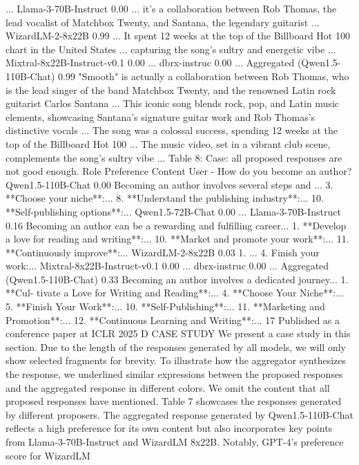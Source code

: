 ...
Llama-3-70B-Instruct
0.00
... it’s a collaboration between Rob Thomas, the lead vocalist of
Matchbox Twenty, and Santana, the legendary guitarist ...
WizardLM-2-8x22B
0.99
... It spent 12 weeks at the top of the Billboard Hot 100 chart in the
United States ... capturing the song’s sultry and energetic vibe ...
Mixtral-8x22B-Instruct-v0.1
0.00
...
dbrx-instruc
0.00
...
Aggregated
(Qwen1.5-110B-Chat)
0.99
"Smooth" is actually a collaboration between Rob Thomas, who is
the lead singer of the band Matchbox Twenty, and the renowned
Latin rock guitarist Carlos Santana ... This iconic song blends rock,
pop, and Latin music elements, showcasing Santana’s signature
guitar work and Rob Thomas’s distinctive vocals ... The song was a
colossal success, spending 12 weeks at the top of the Billboard Hot
100 ... The music video, set in a vibrant club scene, complements
the song’s sultry vibe ...
Table 8: Case: all proposed responses are not good enough.
Role
Preference
Content
User
-
How do you become an author?
Qwen1.5-110B-Chat
0.00
Becoming an author involves several steps and ... 3. **Choose
your niche**:... 8. **Understand the publishing industry**:... 10.
**Self-publishing options**:...
Qwen1.5-72B-Chat
0.00
...
Llama-3-70B-Instruct
0.16
Becoming an author can be a rewarding and fulfilling career... 1.
**Develop a love for reading and writing**:... 10. **Market and
promote your work**:... 11. **Continuously improve**:...
WizardLM-2-8x22B
0.03
1. ... 4. Finish your work:...
Mixtral-8x22B-Instruct-v0.1
0.00
...
dbrx-instruc
0.00
...
Aggregated
(Qwen1.5-110B-Chat)
0.33
Becoming an author involves a dedicated journey... 1. **Cul-
tivate a Love for Writing and Reading**:... 4. **Choose Your
Niche**:... 5. **Finish Your Work**:... 10. **Self-Publishing**:...
11. **Marketing and Promotion**:... 12. **Continuous Learning
and Writing**:...
17
Published as a conference paper at ICLR 2025
D
CASE STUDY
We present a case study in this section. Due to the length of the responses generated by all models,
we will only show selected fragments for brevity. To illustrate how the aggregator synthesizes the
response, we underlined similar expressions between the proposed responses and the aggregated
response in different colors. We omit the content that all proposed responses have mentioned.
Table 7 showcases the responses generated by different proposers. The aggregated response generated
by Qwen1.5-110B-Chat reflects a high preference for its own content but also incorporates key points
from Llama-3-70B-Instruct and WizardLM 8x22B. Notably, GPT-4’s preference score for WizardLM
